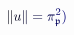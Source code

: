 \documentclass[12pt]{article}
\begin{document}
\makeatletter
\renewcommand*{\@textcolor}[3]{%
  \protect\leavevmode
  \begingroup
    \color#1{#2}#3%
  \endgroup
}
\makeatother
\begin{displaymath}
\mathcolor[RGB]{0,0,15}{\|} \mathcolor[RGB]{0,0,30}{u} \mathcolor[RGB]{0,0,45}{\|} \mathcolor[RGB]{0,0,60}{=} \mathcolor[RGB]{0,0,75}{\pi} _ { \mathfrak { \mathcolor[RGB]{0,0,90}{p} } } ^ { \mathcolor[RGB]{0,0,105}{2} } \mathcolor[RGB]{0,0,120}{)}
\end{displaymath}
\end{document}
